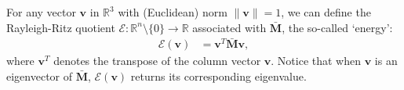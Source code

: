 \documentclass[preprint,12pt]{elsarticle}
\newcommand{\R}{\mathbb R}
\newcommand{\M}{\mathbf{M}}
\newcommand{\bv}{\mathbf{v}}
\begin{document}
For any vector $\bv$ in $\R^3$ with (Euclidean) norm $\|\bv\|=1$, we can define the Rayleigh-Ritz quotient $\mathcal{E}:\R^n\setminus\{0\}\to\R$ associated with $\bar{\M}$, the so-called `energy':
\begin{align}\label{energy_putative_counterexample}
\mathcal{E}(\bv)&=\bv^T\bar{\M}\bv,
\end{align}
where $\bv^T$ denotes the transpose of the column vector $\bv$. Notice that when $\bv$ is an eigenvector of $\bar{\M}$, $\mathcal{E}(\bv)$ returns its corresponding eigenvalue.
\end{document}
